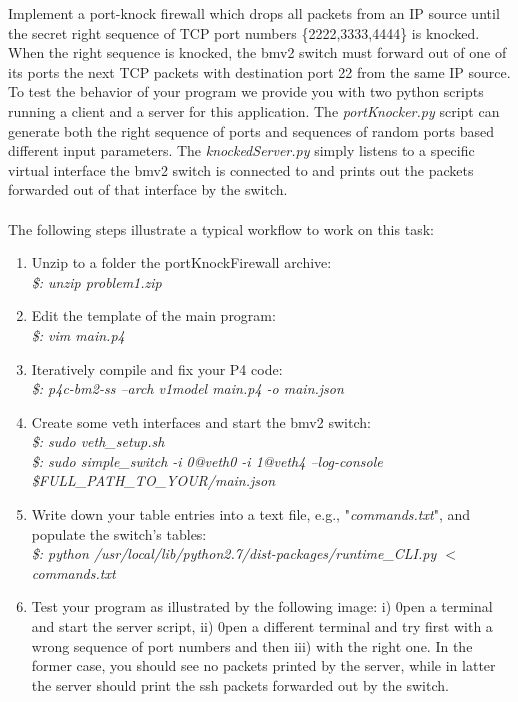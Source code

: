 Implement a port-knock firewall which drops all packets from an IP source until the secret right sequence of TCP port numbers \{2222,3333,4444\} is knocked. When the right sequence is knocked, the bmv2 switch must forward out of one of its ports the next TCP packets with destination port 22 from the same IP source.\\
To test the behavior of your program we provide you with two python scripts running a client and a server for this application. The \textit{portKnocker.py} script can generate both the right sequence of ports and sequences of random ports based different input parameters. The \textit{knockedServer.py} simply listens to a specific virtual interface the bmv2 switch is connected to and prints out the packets forwarded out of that interface by the switch.\\
~\\
The following steps illustrate a typical workflow to work on this task:
\begin{enumerate}
\item Unzip to a folder the portKnockFirewall archive:\\
       \textit{ \$: unzip problem1.zip} 
\item Edit the template of the main program:\\
        \textit{\$: vim main.p4}
\item Iteratively compile and fix your P4 code:\\
       \textit{ \$: p4c-bm2-ss --arch v1model main.p4 -o main.json}
\item Create some veth interfaces and start the bmv2 switch:\\
        \textit{\$: sudo veth\_setup.sh}\\
        \textit{\$: sudo simple\_switch -i 0@veth0 -i 1@veth4 --log-console \$FULL\_PATH\_TO\_YOUR/main.json}
\item Write down your table entries into a text file, e.g., "\textit{commands.txt}", and populate the switch's tables:\\
        \textit{\$: python /usr/local/lib/python2.7/dist-packages/runtime\_CLI.py $<$ commands.txt}
\item Test your program as illustrated by the following image: i) 0pen a terminal and start the server script, ii) 0pen a different terminal and try first with a wrong sequence of port numbers and then iii) with the right one. In the former case, you should see no packets printed by the server, while in latter the server should print the ssh packets forwarded out by the switch.
\end{enumerate}


